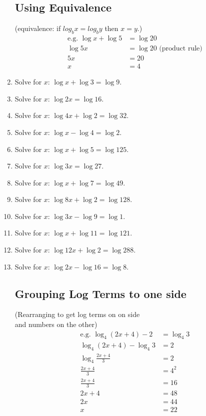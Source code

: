 \documentclass[12pt]{article}
\begin{document}
\begin{enumerate}
\subsection*{Using Equivalence}
(equivalence: if $log_b{x}=log_b{y}$ then $x=y$.)
\begin{align*}
\text{e.g. }\log{x}+\log{5}&=\log{20}\\
\log{5x}&=\log{20}\text{ (product rule)}\\
5x&=20\\
x&=4
\end{align*}

\item Solve for $x$: $\log{x} + \log{3} = \log{9}$.
\item Solve for $x$: $\log{2x} = \log{16}$.
\item Solve for $x$: $\log{4x} + \log{2} = \log{32}$.
\item Solve for $x$: $\log{x} - \log{4} = \log{2}$.
\item Solve for $x$: $\log{x} + \log{5} = \log{125}$.
\item Solve for $x$: $\log{3x} = \log{27}$.
\item Solve for $x$: $\log{x} + \log{7} = \log{49}$.
\item Solve for $x$: $\log{8x} + \log{2} = \log{128}$.
\item Solve for $x$: $\log{3x} - \log{9} = \log{1}$.
\item Solve for $x$: $\log{x} + \log{11} = \log{121}$.
\item Solve for $x$: $\log{12x} + \log{2} = \log{288}$.
\item Solve for $x$: $\log{2x} - \log{16} = \log{8}$.

\subsection*{Grouping Log Terms to one side}

(Rearranging to get log terms on on side\\ and numbers on the other)
\begin{align*}
\text{e.g. }\log_4{(2x+4)}-2&=\log_4{3}\\
\log_4{(2x+4)}-\log_4{3}&=2\\
\log_4{\frac{2x+4}{3}}&=2\\
\frac{2x+4}{3}&=4^2\\
\frac{2x+4}{3}&=16\\
2x+4&=48\\
2x&=44\\
x&=22
\end{align*}


\end{enumerate}
\end{document}
